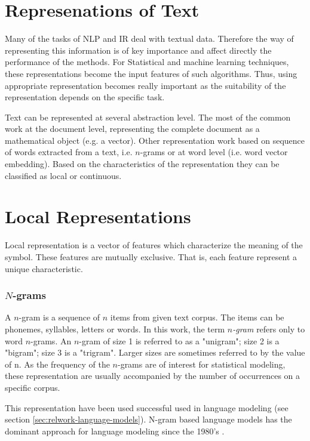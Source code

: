 \section{Represenations of Text}
 \label{sec:rel_represenation_text}
  Many of the tasks of \ac{NLP} and \ac{IR} deal with textual data. Therefore
  the way  of representing this information is of key importance and affect
  directly the performance of the methods.  For  Statistical and machine
  learning techniques, these representations become the input features of
  such algorithms. Thus, using appropriate representation  becomes really
  important as the suitability of the representation  depends on the specific
  task.
  
  Text can be represented at several abstraction level.  The most of the
  common work at the document level, representing the complete document as a
  mathematical object (e.g. a vector). Other representation work based on
  sequence of words extracted from a text, i.e. $n$-grams or at word level
  (i.e. word vector embedding). Based on the characteristics of the
  representation they can be classified as local or continuous. 
 
  

\section{Local Representations}
 \label{sec:rel_local_representation}
 Local representation is a vector of features which characterize the
 meaning of the symbol. These  features  are mutually exclusive. That is, each feature
 represent a unique characteristic.
 
 \subsubsection{$N$-grams}
 \label{sec:sub_ngrams}

A $n$-gram is a sequence of $n$ items from given text corpus. The items can
be phonemes, syllables, letters or words. In this  work, the term
\textit{$n$-gram} refers only   to  word $n$-grams.
An $n$-gram of size 1 is referred to as a "unigram"; size 2 is a "bigram";
size 3 is a "trigram". Larger sizes are sometimes referred to by the value of
n. As the frequency of the $n$-grams are of interest for statistical
modeling, these representation are usually accompanied by the number of
occurrences on a specific corpus. 


This representation  have been used successful used in language modeling (see section
\ref{sec:relwork-language-models}). N-gram based language models has the dominant approach for
 language modeling since the 1980's \cite{Bengio:2008}.


